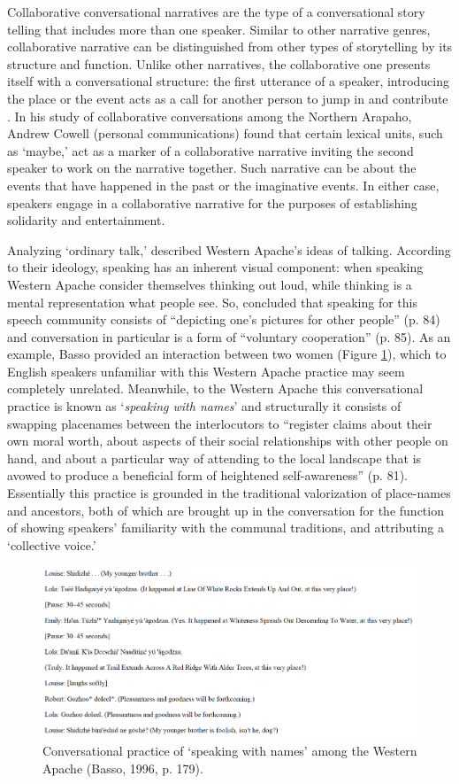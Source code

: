 \documentclass[12pt, draft]{article}
\begin{document}
Collaborative conversational narratives are the type of a conversational story telling that includes more than one speaker. Similar to other narrative genres, collaborative narrative can be distinguished from other types of storytelling by its structure and function. Unlike other narratives, the collaborative one presents itself with a conversational structure: the first utterance of a speaker, introducing the place or the event acts as a call for another person to jump in and contribute \parencite{norrick2000}. In his study of collaborative conversations among the Northern Arapaho, Andrew Cowell (personal communications) found that certain lexical units, such as `maybe,' act as a marker of a collaborative narrative inviting the second speaker to work on the narrative together. Such narrative can be about the events that have happened in the past or the imaginative events. In either case, speakers engage in a collaborative narrative for the purposes of establishing solidarity and entertainment. 

Analyzing `ordinary talk,' \textcite{basso1996} described Western Apache's ideas of talking. According to their ideology, speaking has an inherent visual component: when speaking Western Apache consider themselves thinking out loud, while thinking is a mental representation what people see. So, \textcite{basso1996} concluded that speaking for this speech community consists of ``depicting one's pictures for other people'' (p. 84) and conversation in particular is a form of ``voluntary cooperation'' (p. 85). As an example, Basso provided an interaction between two women (Figure \ref{speaking_names}), which to English speakers unfamiliar with this Western Apache practice may seem completely unrelated. Meanwhile, to the Western Apache this conversational practice is known as `\textit{speaking with names}' and structurally it consists of swapping placenames between the interlocutors to ``register claims about their own moral worth, about aspects of their social relationships with other people on hand, and about a particular way of attending to the local landscape that is avowed to produce a beneficial form of heightened self-awareness'' (p. 81). Essentially this practice is grounded in the traditional valorization of place-names and ancestors, both of which are brought up in the conversation for the function of showing speakers' familiarity with the communal traditions, and attributing a `collective voice.' 
\begin{figure}[ht]
\caption{Conversational practice of `speaking with names' among the Western Apache (Basso, 1996, p. 179).}
\label{speaking_names}
\includegraphics[width=5in]{speaking_names.png}
\end{figure}
\end{document}
